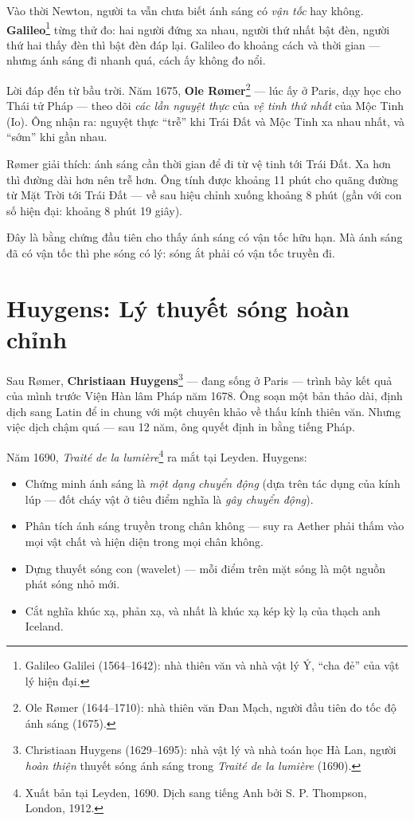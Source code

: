 Vào thời Newton, người ta vẫn chưa biết ánh sáng có \emph{vận tốc} hay không. \textbf{Galileo}\footnote{Galileo Galilei (1564--1642): nhà thiên văn và nhà vật lý Ý, ``cha đẻ'' của vật lý hiện đại.} từng thử đo: hai người đứng xa nhau, người thứ nhất bật đèn, người thứ hai thấy đèn thì bật đèn đáp lại. Galileo đo khoảng cách và thời gian — nhưng ánh sáng đi nhanh quá, cách ấy không đo nổi.

Lời đáp đến từ bầu trời. Năm 1675, \textbf{Ole Rømer}\footnote{Ole Rømer (1644--1710): nhà thiên văn Đan Mạch, người đầu tiên đo tốc độ ánh sáng (1675).} — lúc ấy ở Paris, dạy học cho Thái tử Pháp — theo dõi \emph{các lần nguyệt thực} của \emph{vệ tinh thứ nhất} của Mộc Tinh (Io). Ông nhận ra: nguyệt thực ``trễ'' khi Trái Đất và Mộc Tinh xa nhau nhất, và ``sớm'' khi gần nhau.

Rømer giải thích: ánh sáng cần thời gian để đi từ vệ tinh tới Trái Đất. Xa hơn thì đường dài hơn nên trễ hơn. Ông tính được khoảng 11 phút cho quãng đường từ Mặt Trời tới Trái Đất — về sau hiệu chỉnh xuống khoảng 8 phút (gần với con số hiện đại: khoảng 8 phút 19 giây).

Đây là bằng chứng đầu tiên cho thấy ánh sáng có vận tốc hữu hạn. Mà ánh sáng đã có vận tốc thì phe sóng có lý: sóng ắt phải có vận tốc truyền đi.


\section{Huygens: Lý thuyết sóng hoàn chỉnh}

Sau Rømer, \textbf{Christiaan Huygens}\footnote{Christiaan Huygens (1629--1695): nhà vật lý và nhà toán học Hà Lan, người \emph{hoàn thiện} thuyết sóng ánh sáng trong \emph{Traité de la lumière} (1690).} — đang sống ở Paris — trình bày kết quả của mình trước Viện Hàn lâm Pháp năm 1678. Ông soạn một bản thảo dài, định dịch sang Latin để in chung với một chuyên khảo về thấu kính thiên văn. Nhưng việc dịch chậm quá — sau 12 năm, ông quyết định in bằng tiếng Pháp.

Năm 1690, \emph{Traité de la lumière}\footnote{Xuất bản tại Leyden, 1690. Dịch sang tiếng Anh bởi S. P. Thompson, London, 1912.} ra mắt tại Leyden. Huygens:
\begin{itemize}
  \item Chứng minh ánh sáng là \emph{một dạng} \emph{chuyển động} (dựa trên tác dụng của kính lúp — đốt cháy vật ở tiêu điểm nghĩa là \emph{gây chuyển động}).
  \item Phân tích ánh sáng truyền trong chân không — suy ra Aether phải thấm vào mọi vật chất và hiện diện trong mọi chân không.
  \item Dựng thuyết sóng con (wavelet) — mỗi điểm trên mặt sóng là một nguồn phát sóng nhỏ mới.
  \item Cắt nghĩa khúc xạ, phản xạ, và nhất là khúc xạ kép kỳ lạ của thạch anh Iceland.
\end{itemize}

